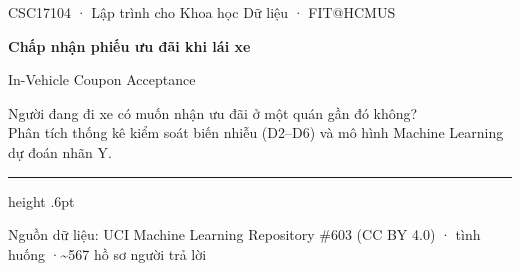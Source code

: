 \documentclass[aspectratio=169,12pt]{beamer}
\begin{document}

\begingroup
{}
\begin{frame}[plain]
  \vspace{20mm}
  {\fontsize{15}{19}\selectfont\color{Accent}CSC17104 · Lập trình cho Khoa học Dữ liệu · FIT@HCMUS\par}
  \vspace{10mm}
  {\fontsize{38}{46}\selectfont\bfseries Chấp nhận phiếu ưu đãi khi lái xe\par}
  \vspace{4mm}
  {\fontsize{21}{27}\selectfont\color{Accent}In-Vehicle Coupon Acceptance\par}
  \vspace{9mm}
  {\fontsize{17.5}{24}\selectfont Người đang đi xe có muốn nhận ưu đãi ở một quán gần đó không?\\
  Phân tích thống kê kiểm soát biến nhiễu (D2–D6) và mô hình Machine Learning dự đoán nhãn Y.\par}
  \vspace{18mm}
  {\color{Line}\hrule height .6pt}\vspace{4mm}
  {\fontsize{13}{17}\selectfont\color{Muted}Nguồn dữ liệu: UCI Machine Learning Repository \#603 (CC BY 4.0) \quad· tình huống \quad·\quad \textasciitilde 567 hồ sơ người trả lời\par}
\end{frame}
\endgroup
\end{document}

